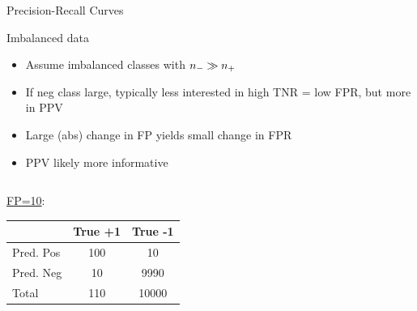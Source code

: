 \begin{frame}{Precision-Recall Curves}


\end{frame}

\begin{vbframe}{Imbalanced data}

\begin{itemize}
     \item Assume imbalanced classes with $n_{-} \gg n_{+}$
     \item If neg class large, typically less interested in high TNR = low FPR,
     but more in PPV
     \item Large (abs) change in FP yields small change in FPR
  \item PPV likely more informative
\end{itemize}

\lz

\begin{columns}
 \begin{column}{0.45\textwidth}
 \underline{FP=10}:\\
 \lz
 {
 \tiny
 \centering
 \tiny
 \begin{tabular}{|l|c|c|}
                 \hline
                & True +1 & True -1 \\ \hline
 Pred. Pos & 100            & 10            \\ \hline
 Pred. Neg & 10            & 9990           \\ \hline
 Total  & 110            & 10000           \\ \hline
 \end{tabular}
 }


\end{column}
\end{columns}
\end{vbframe}

